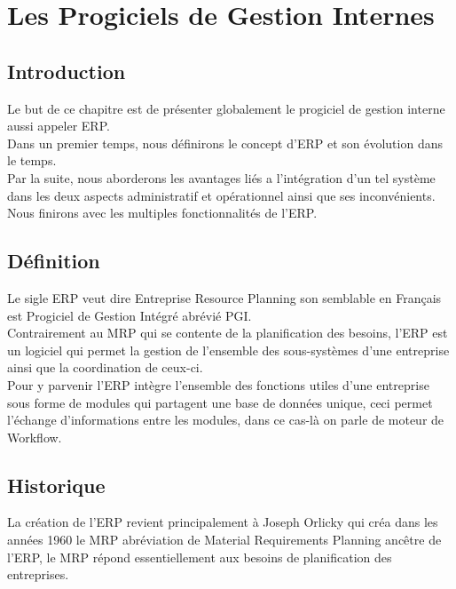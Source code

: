 \chapter{Les Progiciels de Gestion Internes}

\section{Introduction}
Le but de ce chapitre est de présenter globalement le progiciel de gestion interne aussi appeler \acs{ERP}.\\

Dans un premier temps, nous définirons le concept d'\acs{ERP} et son évolution dans le temps.\\

Par la suite, nous aborderons les avantages liés a l'intégration d'un tel système dans les deux aspects administratif et opérationnel ainsi que ses inconvénients.\\

Nous finirons avec les multiples fonctionnalités de l'\acs{ERP}.\\

\section{Définition}
Le sigle \acs{ERP} veut dire Entreprise Resource Planning son semblable en Français est Progiciel de Gestion Intégré abrévié PGI.\\

Contrairement au MRP qui se contente de la planification des besoins, l’\acs{ERP} est un logiciel qui permet la gestion de l’ensemble des sous-systèmes d’une entreprise ainsi que la coordination de ceux-ci.\\

Pour y parvenir l’\acs{ERP} intègre l’ensemble des fonctions utiles d’une entreprise sous forme de modules qui partagent une base de données unique, ceci permet l’échange d’informations entre les modules, dans ce cas-là on parle de moteur de Workflow.

\section{Historique}
La création de l’\acs{ERP} revient principalement à Joseph Orlicky qui créa dans les années 1960 le MRP abréviation de Material Requirements Planning ancêtre de l’\acs{ERP}, le MRP répond essentiellement aux besoins de planification des entreprises.\\

